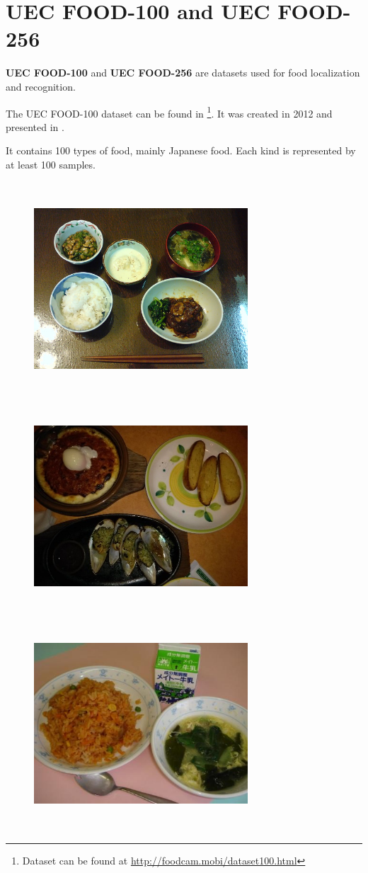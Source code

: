 \section{UEC FOOD-100 and UEC FOOD-256}

\textbf{UEC FOOD-100} and \textbf{UEC FOOD-256} are datasets used for food localization and recognition.

The UEC FOOD-100 dataset can be found in \footnote{Dataset can be found at \url{http://foodcam.mobi/dataset100.html}}. It was created in 2012 and presented in \cite{Matsuda2012a}.

It contains 100 types of food, mainly Japanese food. Each kind is represented by at least 100 samples.

\begin{figure}[h]
    \includegraphics[width=8cm, height=8cm]{img/multiple_food_items_1}
    \includegraphics[width=8cm, height=8cm]{img/multiple_food_items_2}
    \includegraphics[width=8cm, height=8cm]{img/multiple_food_items_3}

\end{figure}
